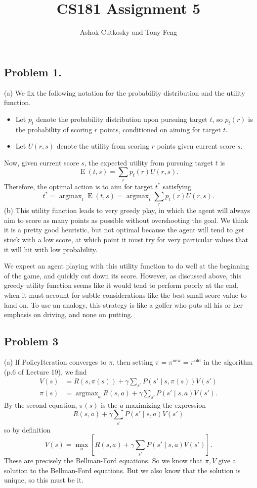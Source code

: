 \documentclass[12pt]{article}
\title{CS181 Assignment 5}
\author{Ashok Cutkosky and Tony Feng}
\DeclareMathOperator{\argmax}{argmax}
\DeclareMathOperator{\E}{E}
\theoremstyle{remark}
\begin{document}
\maketitle

\subsection*{Problem 1.} (a) We fix the following notation for the probability distribution and the utility function. 
\begin{itemize}
\item Let $p_t$ denote the probability distribution upon pursuing target $t$, so $p_t(r)$ is the probability of scoring $r$ points, conditioned on aiming for target $t$. 
\item Let $U(r, s)$ denote the utility from scoring $r$ points given current score $s$. 
\end{itemize} 
Now, given current score $s$, the expected utility from pursuing target $t$ is 
\[
\E(t,s) = \sum_r p_t(r) U(r,s).
\]
Therefore, the optimal action is to aim for target $t^*$ satisfying 
\[
t^* = \displaystyle\argmax_t \E(t,s) = \argmax_t \sum_r p_t(r) U(r,s).
\]
(b) This utility function leads to very greedy play, in which the agent will always aim to score as many points as possible without overshooting the goal. We think it is a pretty good heuristic, but not optimal because the agent will tend to get stuck with a low score, at which point it must try for very particular values that it will hit with low probability. 

We expect an agent playing with this utility function to do well at the beginning of the game, and quickly cut down its score. However, as discussed above, this greedy utility function seems like it would tend to perform poorly at the end, when it must account for subtle considerations like the best small score value to land on. To use an analogy, this strategy is like a golfer who puts all his or her emphasis on driving, and none on putting. \\

\subsection*{Problem 3}(a) If PolicyIteration converges to $\pi$, then setting $\pi = \pi^{\text{new}} = \pi^{\text{old}}$ in the algorithm (p.6 of Lecture 19), we find
\begin{align*}
V(s) &= R(s, \pi(s)) + \gamma \sum_{s'} P(s' \mid s, \pi(s)) V(s') \\
\pi(s) &= \argmax_a R(s,a) + \gamma \sum_{s'} P(s' \mid s,a) V(s').
\end{align*}
By the second equation, $\pi(s)$ is the $a$ maximizing the expression 
\[
R(s, a) + \gamma \sum_{s'} P(s' \mid s, a) V(s')
\]
so by definition 
\[
V(s) = \max_a \left[ R(s,a) + \gamma \sum_{s'} P(s' \mid s,a) V(s') \right].
\]
These are precisely the Bellman-Ford equations. So we know that $\pi,V$ give a solution to the Bellman-Ford equations. But we also know that the solution is unique, so this must be it. \\
\end{document}
